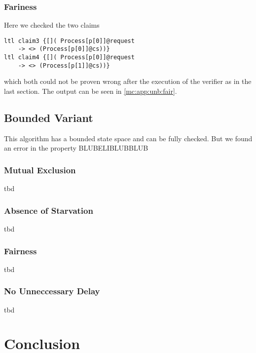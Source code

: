 \documentclass{llncs}
\begin{document}
\subsubsection{Fariness}

Here we checked the two claims

\begin{lstlisting}
ltl claim3 {[]( Process[p[0]]@request 
    -> <> (Process[p[0]]@cs))}
ltl claim4 {[]( Process[p[0]]@request 
    -> <> (Process[p[1]]@cs))}
\end{lstlisting}

which both could not be proven wrong after the execution of the verifier as in the last section.
The output can be seen in \ref{mc:app:unb:fair}.

\subsection{Bounded Variant}

This algorithm has a bounded state space and can be fully checked.
But we found an error in the property BLUBELIBLUBBLUB

\subsubsection{Mutual Exclusion}

tbd

\subsubsection{Absence of Starvation}

tbd

\subsubsection{Fairness}

tbd

\subsubsection{No Unneccessary Delay}

tbd

\section{Conclusion}
\end{document}

